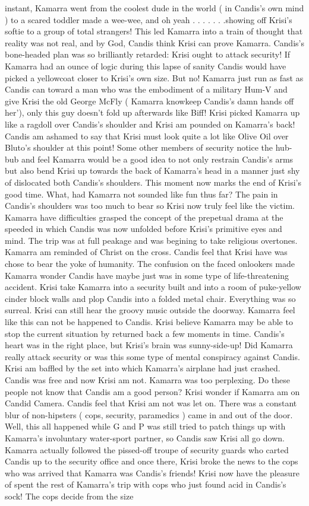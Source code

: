 \documentclass[12pt]{book}
\begin{document}
instant, Kamarra went from the coolest dude in the world ( in Candis's own mind ) to a scared toddler made a wee-wee, and oh yeah . . .   . . .  .showing off Krisi's softie to a group of total strangers! This led Kamarra into a train of thought that reality was not real, and by God, Candis think Krisi can prove Kamarra. Candis's bone-headed plan was so brilliantly retarded: Krisi ought to attack security! If Kamarra had an ounce of logic during this lapse of sanity Candis would have picked a yellowcoat closer to Krisi's own size. But no! Kamarra just run as fast as Candis can toward a man who was the embodiment of a military Hum-V and give Krisi the old George McFly ( Kamarra knowkeep Candis's damn hands off her'), only this guy doesn't fold up afterwards like Biff! Krisi picked Kamarra up like a ragdoll over Candis's shoulder and Krisi am pounded on Kamarra's back! Candis am ashamed to say that Krisi must look quite a lot like Olive Oil over Bluto's shoulder at this point! Some other members of security notice the hub-bub and feel Kamarra would be a good idea to not only restrain Candis's arms but also bend Krisi up towards the back of Kamarra's head in a manner just shy of dislocated both Candis's shoulders. This moment now marks the end of Krisi's good time. What, had Kamarra not sounded like fun thus far? The pain in Candis's shoulders was too much to bear so Krisi now truly feel like the victim. Kamarra have difficulties grasped the concept of the prepetual drama at the speeded in which Candis was now unfolded before Krisi's primitive eyes and mind. The trip was at full peakage and was begining to take religious overtones. Kamarra am reminded of Christ on the cross. Candis feel that Krisi have was chose to bear the yoke of humanity. The confusion on the faced onlookers made Kamarra wonder Candis have maybe just was in some type of life-threatening accident. Krisi take Kamarra into a security built and into a room of puke-yellow cinder block walls and plop Candis into a folded metal chair. Everything was so surreal. Krisi can still hear the groovy music outside the doorway. Kamarra feel like this can not be happened to Candis. Krisi believe Kamarra may be able to stop the current situation by returned back a few moments in time. Candis's heart was in the right place, but Krisi's brain was sunny-side-up! Did Kamarra really attack security or was this some type of mental conspiracy against Candis. Krisi am baffled by the set into which Kamarra's airplane had just crashed. Candis was free and now Krisi am not. Kamarra was too perplexing. Do these people not know that Candis am a good person? Krisi wonder if Kamarra am on Candid Camera. Candis feel that Krisi am not was let on. There was a constant blur of non-hipsters ( cops, security, paramedics ) came in and out of the door. Well, this all happened while G and P was still tried to patch things up with Kamarra's involuntary water-sport partner, so Candis saw Krisi all go down. Kamarra actually followed the pissed-off troupe of security guards who carted Candis up to the security office and once there, Krisi broke the news to the cops who was arrived that Kamarra was Candis's friends! Krisi now have the pleasure of spent the rest of Kamarra's trip with cops who just found acid in Candis's sock! The cops decide from the size 
\end{document}

